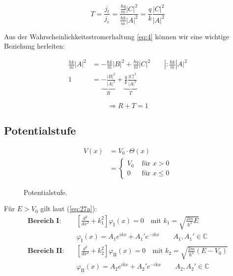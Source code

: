 \begin{equation}
  \label{eq:12}
  T = \frac{j_t}{j_e} = \frac{\frac{\hbar q}{m}|C|^2 }{\frac{\hbar k}{m}|A|^2} = \frac{q}{k} \frac{|C|^2}{|A|^2}
\end{equation}

Aus der Wahrscheinlichkeitsstromerhaltung \eqref{eq:4}   können wir eine wichtige Beziehung herleiten:

\begin{align}
  \label{eq:13}
  \frac{\hbar k}{m} |A|^2 &= -\frac{\hbar k}{m}|B|^2 + \frac{\hbar q}{m} |C|^2 \qquad |:\frac{\hbar k}{m}|A|^2 \\
1 &= \underbrace{-\frac{ |B|^2}{|A|^2}}_{R} +\underbrace{ \frac{q}{k} \frac{|C|^2}{|A|^2}}_{T}
\end{align}

\begin{equation}
  \label{eq:14}
  \Rightarrow \boxed{ R+T=1 }
\end{equation}




\subsection{Potentialstufe}

\begin{figure}[htbp]
  \begin{minipage}[h]{0.4\linewidth}
    \begin{align*}
      V(x)&=V_0\cdot\Theta(x) \\
      &= \begin{cases}
        V_0 & \mbox{ für }x>0\\
        0 & \mbox{ für }x\leq0
      \end{cases}
    \end{align*}
    \vspace{1cm}
  \end{minipage}
  \hfill
  \begin{minipage}[h]{0.5\linewidth}
    
  \end{minipage}
  \caption{Potentialstufe.}
  \label{figu:5}
\end{figure}

Für $E>V_0$ gilt laut (\ref{eq:27a}):
\begin{align*}
    \textbf{Bereich I:} \quad &\left[\frac{d^2}{dx^2}+k_1^2\right]\varphi_{\text{I}}(x)=0 
    \quad \textrm{mit } k_1=\sqrt{\frac{2m}{\hbar^2}E} \\
    &\varphi_\textrm{I}(x)=A_1e^{ikx}+A_1'e^{-ikx} \qquad A_1,A_1' \in \mathbb{C} \\[2ex]
    \textbf{Bereich II:} \quad &\left[\frac{d^2}{dx^2}+k_2^2\right]\varphi_{\text{II}}(x)=0
    \quad  \textrm{mit } k_2=\sqrt{\frac{2m}{\hbar^2}(E-V_0)} \\
     &\varphi_\textrm{II}(x)=A_2e^{ikx}+A_2'e^{-ikx} \qquad A_2,A_2' \in \mathbb{C}
\end{align*}

